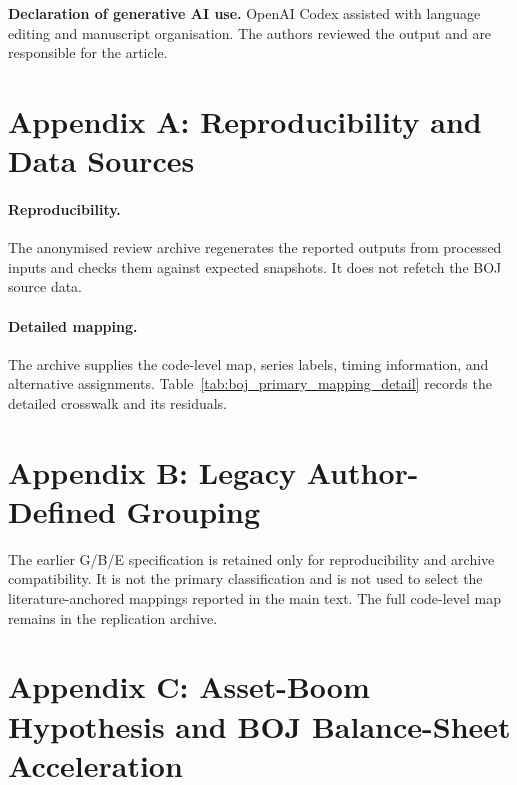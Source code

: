 \documentclass[11pt]{article}
\begin{document}
\medskip
\noindent\textbf{Declaration of generative AI use.}
OpenAI Codex assisted with language editing and manuscript organisation. The
authors reviewed the output and are responsible for the article.
\endgroup

\newpage
\appendix

\section*{Appendix A: Reproducibility and Data Sources}

\paragraph{Reproducibility.}
The anonymised review archive regenerates the reported outputs from processed
inputs and checks them against expected snapshots. It does not refetch the BOJ
source data.

\paragraph{Detailed mapping.}
The archive supplies the code-level map, series labels, timing information,
and alternative assignments. Table~\ref{tab:boj_primary_mapping_detail}
records the detailed crosswalk and its residuals.


\newpage
\section*{Appendix B: Legacy Author-Defined Grouping}

The earlier G/B/E specification is retained only for reproducibility and
archive compatibility. It is not the primary classification and is not used to
select the literature-anchored mappings reported in the main text. The full
code-level map remains in the replication archive.


\newpage
\section*{Appendix C: Asset-Boom Hypothesis and BOJ Balance-Sheet Acceleration}
\end{document}
